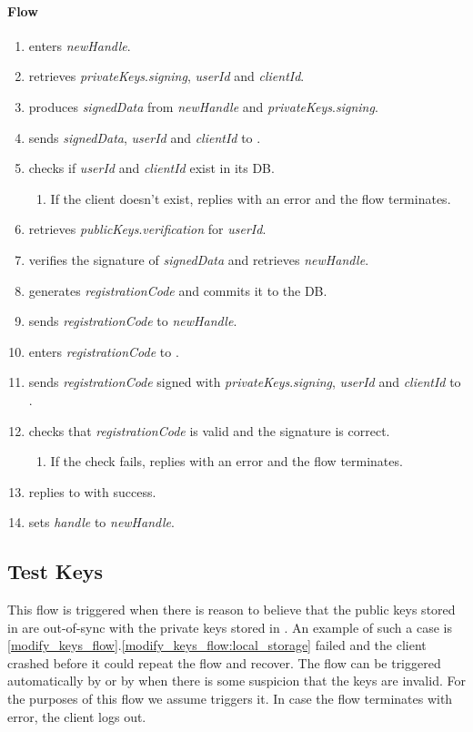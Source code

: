 \documentclass[a4paper,10pt,draft]{article}
\newcommand{\signedData}{\emph{signedData}}
\newcommand{\handle}{\emph{handle}}
\newcommand{\registrationCode}{\emph{registrationCode}}
\newcommand{\privateKeys}{\emph{privateKeys}}
\newcommand{\publicKeys}{\emph{publicKeys}}
\newcommand{\signingKey}{\privateKeys{}.\emph{signing}}
\newcommand{\verificationKey}{\publicKeys{}.\emph{verification}}
\newcommand{\userId}{\emph{userId}}
\newcommand{\clientId}{\emph{clientId}}
\newcommand{\newHandle}{\emph{newHandle}}
\begin{document}
\paragraph{Flow}

\begin{enumerate}
 \item \User{} enters \newHandle{}.
 \item \Client{} retrieves \signingKey{}, \userId{} and \clientId{}.
 \item \Client{} produces \signedData{} from \newHandle{} and \signingKey{}.
 \item \Client{} sends \signedData{}, \userId{} and \clientId{} to \Server{}.
 \item \Server{} checks if \userId{} and \clientId{} exist in its DB.
 \begin{enumerate}
  \item If the client doesn't exist, \Server{} replies with an error and the flow terminates.
 \end{enumerate}
 \item \Server{} retrieves \verificationKey{} for \userId{}.
 \item \Server{} verifies the signature of \signedData{} and retrieves \newHandle{}.
 \item \Server{} generates \registrationCode{} and commits it to the DB.
 \item \Server{} sends \registrationCode{} to \newHandle{}.
 \item \User{} enters \registrationCode{} to \Client{}.
 \item \Client{} sends \registrationCode{} signed with \signingKey{}, \userId{} and \clientId{} to \Server{}.
 \item \Server{} checks that \registrationCode{} is valid and the signature is correct.
 \begin{enumerate}
  \item If the check fails, \Server{} replies with an error and the flow terminates.
 \end{enumerate}
 \item \Server{} replies to \Client{} with success.
 \item \Client{} sets \handle{} to \newHandle{}.
\end{enumerate}

\subsection{Test Keys}
\label{test_keys_flow}
This flow is triggered when there is reason to believe that the public keys stored in \Server{} are out-of-sync with the private keys stored in \Client{}. An example of such a 
case is \ref{modify_keys_flow}.\ref{modify_keys_flow:local_storage} failed and the client crashed before it could repeat the flow and recover. The flow can be triggered 
automatically by \Client{} or by \User{} when there is some suspicion that the keys are invalid. For the purposes of this flow we assume \Client{} triggers it. In case the flow 
terminates with error, the client logs out.
\end{document}
